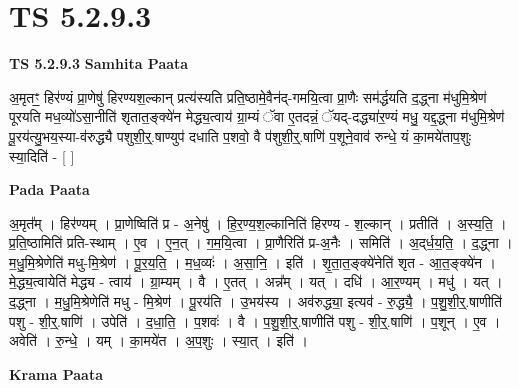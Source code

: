 \documentclass[17pt]{extarticle}
\begin{document}
\section{ TS 5.2.9.3 }

\textbf{TS 5.2.9.3 } \newline
\textbf{Samhita Paata} \newline

अ॒मृतꣳ॒॒ हिर॑ण्यं प्रा॒णेषु॑ हिरण्यश॒ल्कान् प्रत्य॑स्यति प्रति॒ष्ठामे॒वैन॑द्-गमयि॒त्वा प्रा॒णैः सम॑र्द्धयति द॒द्ध्ना म॑धुमि॒श्रेण॑ पूरयति मध॒व्यो॑ऽसा॒नीति॑ शृतात॒ङ्क्ये॑न मेद्ध्य॒त्वाय॑ ग्रा॒म्यं ॅवा ए॒तदन्नं॒ ॅयद्-दद्ध्या॑र॒ण्यं मधु॒ यद्द॒द्ध्ना म॑धुमि॒श्रेण॑ पू॒रय॑त्यु॒भय॒स्या-व॑रुद्ध्यै पशुशी॒र्॒.षाण्युप॑ दधाति प॒शवो॒ वै प॑शुशी॒र्॒.षाणि॑ प॒शूने॒वाव॑ रुन्धे॒ यं का॒मये॑ताप॒शुः स्या॒दिति॑ - [  ] \newline

\textbf{Pada Paata} \newline

अ॒मृत᳚म् । हिर॑ण्यम् । प्रा॒णेष्विति॑ प्र - अ॒नेषु॑ । हि॒र॒ण्य॒श॒ल्कानिति॑ हिरण्य - श॒ल्कान् । प्रतीति॑ । अ॒स्य॒ति॒ । प्र॒ति॒ष्ठामिति॑ प्रति-स्थाम् । ए॒व । ए॒न॒त् । ग॒म॒यि॒त्वा । प्रा॒णैरिति॑ प्र-अ॒नैः । समिति॑ । अ॒द्‌र्ध॒य॒ति॒ । द॒द्ध्ना । म॒धु॒मि॒श्रेणेति॑ मधु-मि॒श्रेण॑ । पू॒र॒य॒ति॒ । म॒ध॒व्यः॑ । अ॒सा॒नि॒ । इति॑ । शृ॒ता॒त॒ङ्क्ये॑नेति॑ शृत - आ॒त॒ङ्क्ये॑न । मे॒द्ध्य॒त्वायेति॑ मेद्ध्य - त्वाय॑ । ग्रा॒म्यम् । वै । ए॒तत् । अन्न᳚म् । यत् । दधि॑ । आ॒र॒ण्यम् । मधु॑ । यत् । द॒द्ध्ना । म॒धु॒मि॒श्रेणेति॑ मधु - मि॒श्रेण॑ । पू॒रय॑ति । उ॒भय॑स्य । अव॑रुद्ध्या॒ इत्यव॑ - रु॒द्ध्यै॒ । प॒शु॒शी॒र्॒.षाणीति॑ पशु - शी॒र्॒.षाणि॑ । उपेति॑ । द॒धा॒ति॒ । प॒शवः॑ । वै । प॒शु॒शी॒र्॒.षाणीति॑ पशु - शी॒र्॒.षाणि॑ । प॒शून् । ए॒व । अवेति॑ । रु॒न्धे॒ । यम् । का॒मये॑त । अ॒प॒शुः । स्या॒त् । इति॑ ।  \newline


\textbf{Krama Paata} \newline
\end{document}
